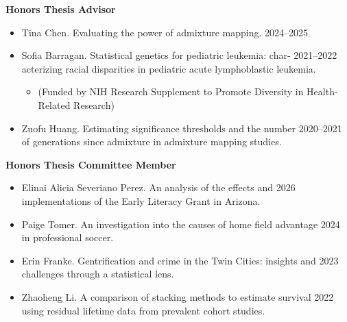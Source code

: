 \documentclass[margin]{res}
\begin{document}
\begin{resume}
\textbf{Honors Thesis Advisor}
\begin{itemize}

\item Tina Chen. Evaluating the power of admixture mapping. \hfill 2024--2025

\item Sofia Barragan. Statistical genetics for pediatric leukemia: char- \hfill 2021--2022 \\ acterizing racial disparities in pediatric acute lymphoblastic leukemia.
	\begin{itemize}[leftmargin=-0in]  \vspace{-0.2cm}
	\item[]\begin{footnotesize}(Funded by NIH Research Supplement to Promote Diversity in Health-Related Research) \end{footnotesize}
	\end{itemize}

\item Zuofu Huang. Estimating significance thresholds and the number  \hfill 2020--2021 \\of generations since admixture in admixture mapping studies. %

\end{itemize}

\textbf{Honors Thesis Committee Member}
\begin{itemize}
 
\item Elinai Alicia Severiano Perez. An analysis of the effects and  \hfill 2026 \\
implementations of the Early Literacy Grant in Arizona.

\item Paige Tomer.  An investigation into the causes of home field advantage \hfill 2024 \\ in professional soccer. 

\item Erin Franke. Gentrification and crime in the Twin Cities: insights and \hfill 2023 \\ challenges through a statistical lens. 

\item Zhaoheng Li. A comparison of stacking methods to estimate survival  \hfill 2022 \\ using residual lifetime data from prevalent cohort studies.  \\


\end{itemize}
\end{resume}
\end{document}
